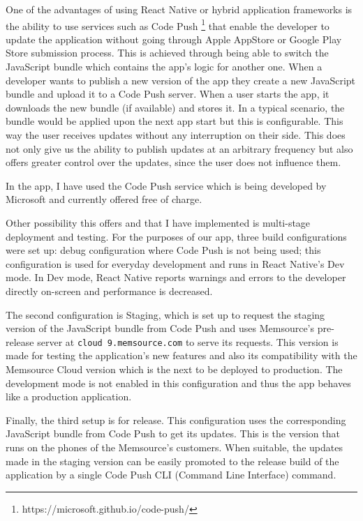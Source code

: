 One of the advantages of using React Native or hybrid application frameworks is the ability to use services such as Code Push \footnote{https://microsoft.github.io/code-push/} that enable the developer to update the application without going through Apple AppStore or Google Play Store submission process. This is achieved through being able to switch the JavaScript bundle which contains the app’s logic for another one. When a developer wants to publish a new version of the app they create a new JavaScript bundle and upload it to a Code Push server. 
When a user starts the app, it downloads the new bundle (if available) and stores it. In a typical scenario, the bundle would be applied upon the next app start but this is configurable. This way the user receives updates without any interruption on their side. This does not only give us the ability to publish updates at an arbitrary frequency but also offers greater control over the updates, since the user does not influence them.


In the app, I have used the Code Push service which is being developed by Microsoft and currently offered free of charge. 


Other possibility this offers and that I have implemented is multi-stage deployment and testing. For the purposes of our app, three build configurations were set up: debug configuration where Code Push is not being used; this configuration is used for everyday development and runs in React Native’s Dev mode. In Dev mode, React Native reports warnings and errors to the developer directly on-screen and performance is decreased.

The second configuration is Staging, which is set up to request the staging version of the JavaScript bundle from Code Push and uses Memsource’s pre-release server at \texttt{cloud 9.memsource.com} to serve its requests. This version is made for testing the application's new features and also its compatibility with the Memsource Cloud version which is the next to be deployed to production. The development mode is not enabled in this configuration and thus the app behaves like a production application. 


Finally, the third setup is for release. This configuration uses the corresponding JavaScript bundle from Code Push to get its updates. This is the version that runs on the phones of the Memsource’s customers. When suitable, the updates made in the staging version can be easily promoted to the release build of the application by a single Code Push CLI (Command Line Interface) command.


